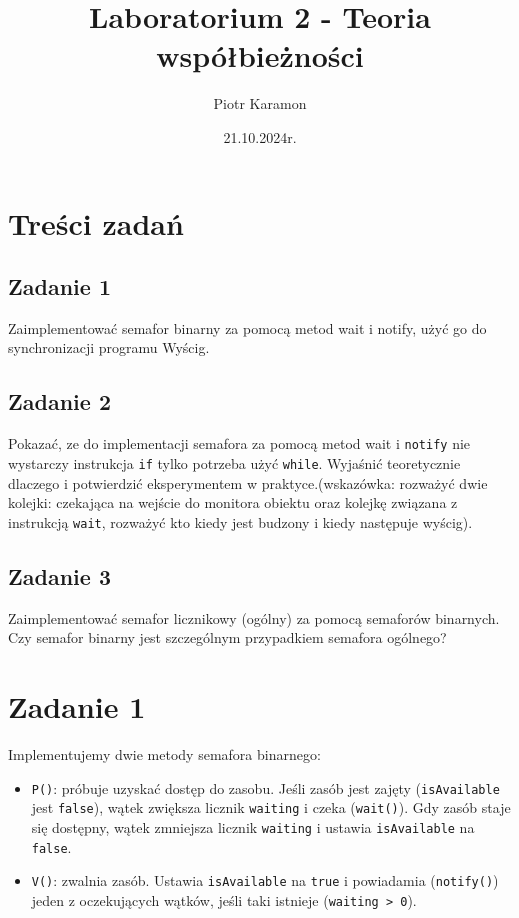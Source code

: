 \documentclass[11pt]{article}
\author{Piotr Karamon}
\date{21.10.2024r.}
\title{Laboratorium 2 - Teoria współbieżności}
\begin{document}
\maketitle
\section*{Treści zadań}
\label{sec:org43b7359}
\subsection*{Zadanie 1}
\label{sec:org17a8b03}
Zaimplementować semafor binarny za pomocą metod wait i notify, użyć go do
synchronizacji programu Wyścig.
\subsection*{Zadanie 2}
\label{sec:orgd99b04c}
Pokazać, ze do implementacji semafora za pomocą metod wait i \texttt{notify} nie
wystarczy instrukcja \texttt{if} tylko potrzeba użyć \texttt{while}. Wyjaśnić teoretycznie
dlaczego i potwierdzić eksperymentem w praktyce.(wskazówka: rozważyć dwie
kolejki: czekająca na wejście do monitora obiektu oraz kolejkę związana z
instrukcją \texttt{wait}, rozważyć kto kiedy jest budzony i kiedy następuje wyścig).
\subsection*{Zadanie 3}
\label{sec:orgcf31ab0}
Zaimplementować semafor licznikowy (ogólny) za pomocą semaforów binarnych. Czy
semafor binarny jest szczególnym przypadkiem semafora ogólnego?
\section*{Zadanie 1}
\label{sec:orgecd68bf}

Implementujemy dwie metody semafora binarnego:

\begin{itemize}
\item \texttt{P()}: próbuje uzyskać dostęp do zasobu. Jeśli
zasób jest zajęty (\texttt{isAvailable} jest \texttt{false}), wątek zwiększa licznik \texttt{waiting} i
czeka (\texttt{wait()}). Gdy zasób staje się dostępny, wątek zmniejsza licznik \texttt{waiting}
i ustawia \texttt{isAvailable} na \texttt{false}.
\item \texttt{V()}: zwalnia zasób. Ustawia \texttt{isAvailable} na \texttt{true}
i powiadamia (\texttt{notify()}) jeden z oczekujących wątków, jeśli taki istnieje
(\texttt{waiting > 0}).
\end{itemize}
\end{document}
